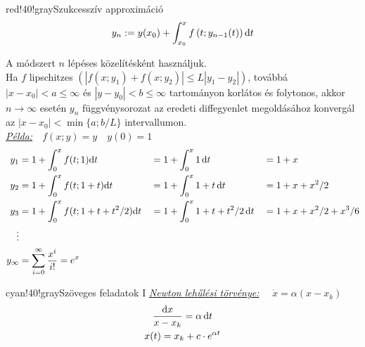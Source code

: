 \documentclass[main.tex]{subfiles}
\begin{document}
\begin{cbox}{red!40!gray}{Szukcesszív approximáció}
  \[
    y_n := y(x_0) + \int_{x_0}^x f \left(
    t; y_{n-1}(t)
    \right) \mathrm{d} t
  \]

  A módszert $n$ lépéses közelítésként használjuk.
  \\[2mm]
  Ha $f$ lipschitzes $\left(|f(x; y_1) + f(x; y_2)| \leq
    L |y_1 - y_2|\right)$, továbbá $|x-x_0|<a\leq\infty$
  és $|y-y_0|<b\leq\infty$ tartományon korlátos és
  folytonos, akkor $n \rightarrow \infty$ esetén $y_n$
  függvénysorozat az eredeti diffegyenlet megoldásához
  konvergál az $|x - x_0| < \min \{a; b/L\}$ intervallumon.
  \\[2mm]
  \emph{\underline{Példa:}}$\quad f(x; y) = y \quad y(0) = 1$
  \begin{alignat*}{3}
    y_1
     & = 1 + \int_0^x f(t; 1) \mathrm{d} t
     &                                                & = 1 + \int_0^x 1 \, \mathrm{d} t
     &                                                & = 1 + x
    \\
    y_2
     & = 1 + \int_0^x f(t; 1+t) \mathrm{d} t
     &                                                & = 1 + \int_0^x 1+t \, \mathrm{d} t
     &                                                & = 1 + x + x^2/2
    \\
    y_3
     & = 1 + \int_0^x f(t; 1+t+t^2/2) \mathrm{d} t
     &                                                & = 1 + \int_0^x 1+t+t^2/2 \, \mathrm{d} t
     &                                                & = 1 + x + x^2/2 + x^3/6
    \\
    \vdots
     &
    \\
    y_\infty
     & = \sum_{i=0}^\infty \frac{x^i}{i!} = e^x
  \end{alignat*}
\end{cbox}

\begin{cbox}{cyan!40!gray}{Szöveges feladatok I}
  \emph{\underline{Newton lehűlési törvénye:}}
  $\quad \dot{x} = \alpha(x - x_k)$
  \begin{gather*}
    \frac{\mathrm{d} x}{x - x_k} = \alpha \, \mathrm{d} t
    \\
    x(t) = x_k + c \cdot e^{\alpha t}
  \end{gather*}

\end{cbox}
\end{document}
